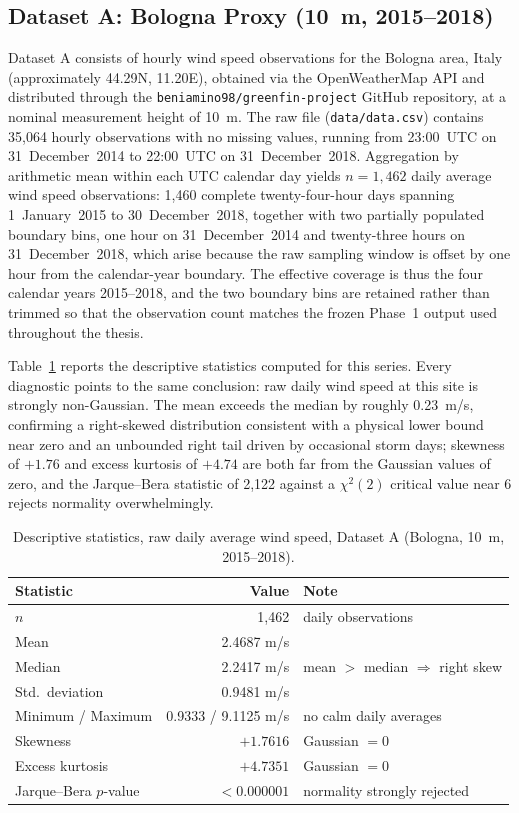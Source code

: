 \documentclass[11pt, a4paper, twoside]{article}
\begin{document}
\subsection{Dataset A: Bologna Proxy (10~m, 2015--2018)}
\label{sec:data-a}

Dataset A consists of hourly wind speed observations for the Bologna area, Italy (approximately 44.29\textdegree{}N, 11.20\textdegree{}E), obtained via the OpenWeatherMap API and distributed through the \texttt{beniamino98/greenfin-project} GitHub repository, at a nominal measurement height of 10~m. The raw file (\texttt{data/data.csv}) contains 35{,}064 hourly observations with no missing values, running from 23:00~UTC on 31~December~2014 to 22:00~UTC on 31~December~2018. Aggregation by arithmetic mean within each UTC calendar day yields $n = 1{,}462$ daily average wind speed observations: 1{,}460 complete twenty-four-hour days spanning 1~January~2015 to 30~December~2018, together with two partially populated boundary bins, one hour on 31~December~2014 and twenty-three hours on 31~December~2018, which arise because the raw sampling window is offset by one hour from the calendar-year boundary. The effective coverage is thus the four calendar years 2015--2018, and the two boundary bins are retained rather than trimmed so that the observation count matches the frozen Phase~1 output used throughout the thesis.

Table~\ref{tab:desc-a} reports the descriptive statistics computed for this series. Every diagnostic points to the same conclusion: raw daily wind speed at this site is strongly non-Gaussian. The mean exceeds the median by roughly 0.23~m/s, confirming a right-skewed distribution consistent with a physical lower bound near zero and an unbounded right tail driven by occasional storm days; skewness of $+1.76$ and excess kurtosis of $+4.74$ are both far from the Gaussian values of zero, and the Jarque--Bera statistic of 2{,}122 against a $\chi^2(2)$ critical value near 6 rejects normality overwhelmingly.

\begin{table}[htbp]
\centering
\caption{Descriptive statistics, raw daily average wind speed, Dataset A (Bologna, 10~m, 2015--2018).}
\label{tab:desc-a}
\begin{tabular}{lrl}
\toprule
\textbf{Statistic} & \textbf{Value} & \textbf{Note} \\
\midrule
$n$ & 1{,}462 & daily observations \\
Mean & 2.4687 m/s & \\
Median & 2.2417 m/s & mean $>$ median $\Rightarrow$ right skew \\
Std.\ deviation & 0.9481 m/s & \\
Minimum / Maximum & 0.9333 / 9.1125 m/s & no calm daily averages \\
Skewness & $+1.7616$ & Gaussian $= 0$ \\
Excess kurtosis & $+4.7351$ & Gaussian $= 0$ \\
Jarque--Bera $p$-value & $< 0.000001$ & normality strongly rejected \\
\bottomrule
\end{tabular}
\end{table}
\end{document}
